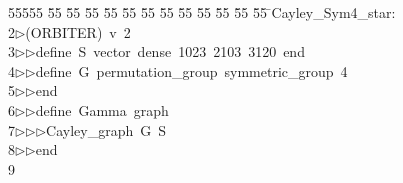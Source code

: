 %
%
\begin{tabbing}
55555 \= 55 \= 55 \= 55 \= 55 \= 55 \= 55 \= 55 \= 55 \= 55 \= 55 \= 55 \= 55 \= \>Cayley\_Sym4\_star:\\[0pt]
2\>$\triangleright$\>(ORBITER)\ v\ 2\ \\[0pt]
3\>$\triangleright$\>$\triangleright$\>define\ S\ vector\ dense\ 1023\ 2103\ 3120\ end\ \\[0pt]
4\>$\triangleright$\>$\triangleright$\>define\ G\ permutation\_group\ symmetric\_group\ 4\ \\[0pt]
5\>$\triangleright$\>$\triangleright$\>end\ \\[0pt]
6\>$\triangleright$\>$\triangleright$\>define\ Gamma\ graph\ \\[0pt]
7\>$\triangleright$\>$\triangleright$\>$\triangleright$\>Cayley\_graph\ G\ S\ \\[0pt]
8\>$\triangleright$\>$\triangleright$\>end\ \\[0pt]
9\>\end{tabbing}
